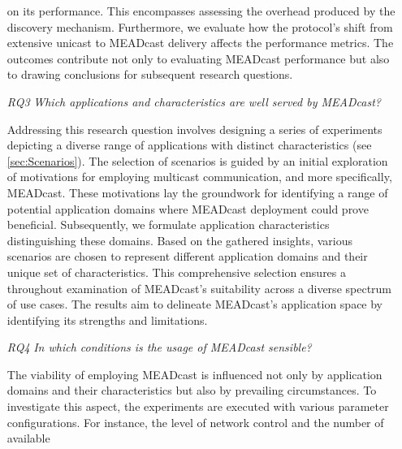 \begin{enumerate}
            on its performance.
        This encompasses assessing the overhead produced by the discovery
            mechanism.
        Furthermore, we evaluate how the protocol's shift from extensive
            unicast to MEADcast delivery affects the performance metrics.
        The outcomes contribute not only to evaluating MEADcast performance but
            also to drawing conclusions for subsequent research questions.
        \item[\textit{RQ3}]\label{rq3}
        \textit{Which applications and characteristics are well served by
        MEADcast?}\par
        Addressing this research question involves designing a series of 
            experiments depicting a diverse range of applications with distinct
            characteristics (see \autoref{sec:Scenarios}).
        The selection of scenarios is guided by an initial exploration of
            motivations for employing multicast communication, and more
            specifically, MEADcast.
        These motivations lay the groundwork for identifying a range of
            potential application domains where MEADcast deployment could prove
            beneficial.
        Subsequently, we formulate application characteristics distinguishing
            these domains.
        Based on the gathered insights, various scenarios are chosen to
            represent different application domains and their unique set of
            characteristics.
        This comprehensive selection ensures a throughout examination of
            MEADcast's suitability across a diverse spectrum of use cases.
        The results aim to delineate MEADcast's application space by
            identifying its strengths and limitations.
    \item[\textit{RQ4}] \label{rq4}
        \textit{In which conditions is the usage of MEADcast sensible?}\par
        The viability of employing MEADcast is influenced not only by
            application domains and their characteristics but also by
            prevailing circumstances.
        To investigate this aspect, the experiments are executed with various
            parameter configurations.
        For instance, the level of network control and the number of available

\end{enumerate}
